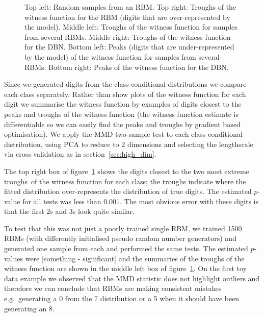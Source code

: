 \documentclass{article} %
\def\eg{e.g.\ }
\begin{document}
\begin{figure}[ht]
\caption{
Top left: Random samples from an RBM.
Top right: Troughs of the witness function for the RBM (digits that are over-represented by the model).
Middle left: Troughs of the witness function for samples from several RBMs.
Middle right: Troughs of the witness function for the DBN.
Bottom left: Peaks (digits that are under-represented by the model) of the witness function for samples from several RBMs.
Bottom right: Peaks of the witness function for the DBN.
}
\label{fig:digits}
\end{figure}

Since we generated digits from the class conditional distributions we compare each class separately.
Rather than show plots of the witness function for each digit we summarise the witness function by examples of digits closest to the peaks and troughs of the witness function (the witness function estimate is differentiable so we can easily find the peaks and troughs by gradient based optimisation).
We apply the MMD two-sample test to each class conditional distribution, using PCA to reduce to 2 dimensions and selecting the lengthscale via cross validation as in section~\ref{sec:high_dim}.

The top right box of figure~\ref{fig:digits} shows the digits closest to the two most extreme troughs\footnotemark~of the witness function for each class; the troughs indicate where the fitted distribution over-represents the distribution of true digits.
The estimated $p$-value for all tests was less than 0.001.
The most obvious error with these digits is that the first 2s and 3s look quite similar.

To test that this was not just a poorly trained single RBM, we trained 1500 RBMs (with differently initialised pseudo random number generators) and generated one sample from each and performed the same tests.
The estimated $p$-values were [something - significant] and the summaries of the troughs of the witness function are shown in the middle left box of figure~\ref{fig:digits}.
On the first toy data example we observed that the MMD statistic does not highlight outliers and therefore we can conclude that RBMs are making consistent mistakes \eg generating a 0 from the 7 distribution or a 5 when it should have been generating an 8.
\end{document}
